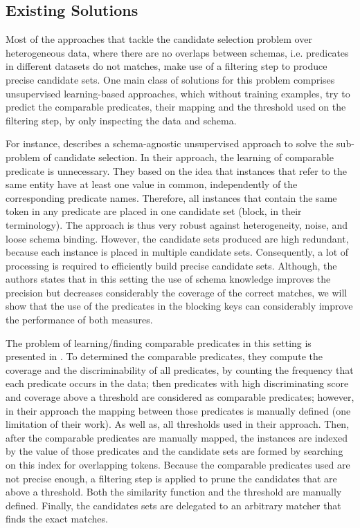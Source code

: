  

\subsection{Existing Solutions} Most of the approaches that tackle the candidate selection problem over heterogeneous data, where there are no overlaps between schemas, i.e. predicates in different datasets do not matches, make use of a filtering step to produce precise candidate sets. One main class of solutions for this problem comprises unsupervised learning-based approaches, which without training examples, try to  predict the comparable predicates, their mapping and the threshold used on the filtering step, by only inspecting the data and schema.

For instance, \cite{DBLP:conf/wsdm/PapadakisINF11} describes a schema-agnostic unsupervised approach to solve the sub-problem of candidate selection. In their approach, the learning of comparable predicate is unnecessary. They based on the idea that instances that refer to the same entity have at least one value in common, independently of the corresponding predicate names. Therefore, all instances that contain the same token in any predicate are placed in one candidate set (block, in their terminology). The approach is thus very robust against heterogeneity, noise, and loose schema binding. However, the candidate sets produced are high redundant, because each instance is placed in multiple candidate sets. Consequently, a lot of processing is required to efficiently build precise candidate sets. Although, the authors states that in this setting the use of schema knowledge improves the precision but decreases considerably the coverage of the correct matches, we will show that the use of the predicates in the blocking keys can considerably improve the performance of both measures. 

The problem of learning/finding comparable predicates in this setting is presented in \cite{DBLP:conf/semweb/SongH11}. To determined the comparable predicates, they compute the coverage and the discriminability of all predicates, by counting the frequency that each predicate occurs in the data; then predicates with high discriminating score and coverage above a threshold are considered as comparable predicates; however, in their approach the mapping between those predicates is manually defined (one limitation of their work). As well as, all thresholds used in their approach. Then, after the comparable predicates are manually mapped, the instances are indexed by the value of those predicates and the candidate sets are formed by searching on this index for overlapping tokens. Because the comparable predicates used are not precise enough, a filtering step is applied to prune the candidates that are above a threshold. Both the similarity function and the threshold are manually defined. Finally, the candidates sets are delegated to an arbitrary matcher that finds the exact matches. 



